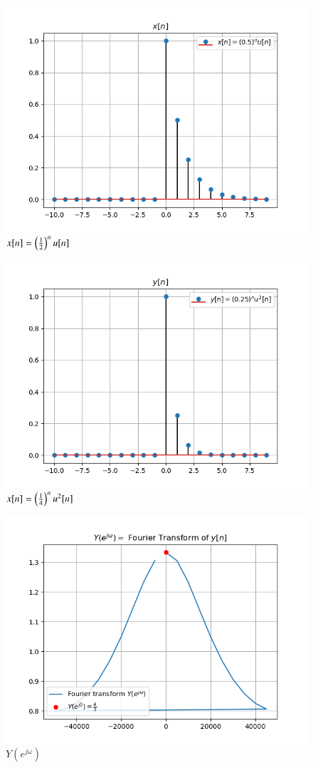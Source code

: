\documentclass[journal,12pt,twocolumn]{IEEEtran}
\begin{document}
\begin{figure}[!ht]
\centering
 \includegraphics[width=\columnwidth]{graphs/x_n.png}
 \caption{$x[n] = \left(\frac{1}{2}\right)^nu[n]$}
 \end{figure}
 
 \begin{figure}[!ht]
\centering
 \includegraphics[width=\columnwidth]{graphs/y_n.png}
 \caption{$x[n] = \left(\frac{1}{4}\right)^nu^2[n]$}
 \end{figure}
 
 \begin{figure}[!ht]
\centering
 \includegraphics[width=\columnwidth]{graphs/fourier.png}
 \caption{$Y(e^{j\omega})$}
 \end{figure}
\end{document}
